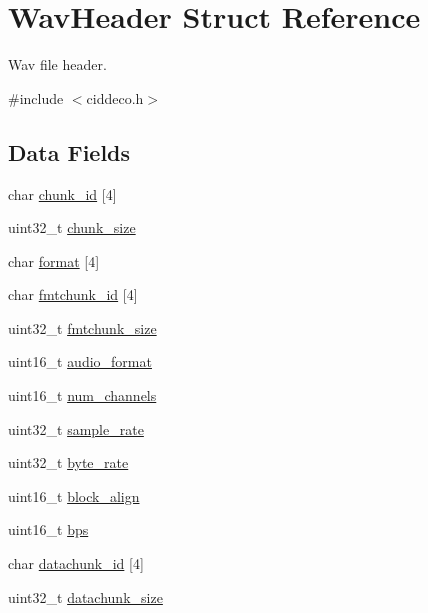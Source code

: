 \hypertarget{structWavHeader}{}\section{Wav\+Header Struct Reference}
\label{structWavHeader}


Wav file header.  




{\ttfamily \#include $<$ciddeco.\+h$>$}

\subsection*{Data Fields}
\begin{DoxyCompactItemize}
\item 
char \hyperlink{structWavHeader_abd1d58ce017d5f2b70956efb6cf0b8fc}{chunk\+\_\+id} \mbox{[}4\mbox{]}
\item 
uint32\+\_\+t \hyperlink{structWavHeader_a480084e5c629d831fcdbc1c8d8b0a891}{chunk\+\_\+size}
\item 
char \hyperlink{structWavHeader_ab1748144c5a74f514973d13aa2257e7c}{format} \mbox{[}4\mbox{]}
\item 
char \hyperlink{structWavHeader_a627f513d728348d196e9a01094a9a2a4}{fmtchunk\+\_\+id} \mbox{[}4\mbox{]}
\item 
uint32\+\_\+t \hyperlink{structWavHeader_a4ef84c118ca11eb3aca198b8e2a14294}{fmtchunk\+\_\+size}
\item 
uint16\+\_\+t \hyperlink{structWavHeader_a175a26284b9fe51691b0a4e600997dca}{audio\+\_\+format}
\item 
uint16\+\_\+t \hyperlink{structWavHeader_a072ed76b242729913c20ed54643c7516}{num\+\_\+channels}
\item 
uint32\+\_\+t \hyperlink{structWavHeader_ae6042020cde1102dfeabfc30576c1e52}{sample\+\_\+rate}
\item 
uint32\+\_\+t \hyperlink{structWavHeader_a9e6e51114d572f6fe71cd00cd101343d}{byte\+\_\+rate}
\item 
uint16\+\_\+t \hyperlink{structWavHeader_a55417acd8c1774caee8928ad8fe86c07}{block\+\_\+align}
\item 
uint16\+\_\+t \hyperlink{structWavHeader_a891be94aa1622e40a40b1887ec0d950f}{bps}
\item 
char \hyperlink{structWavHeader_a5baeb0eb6368ca4135a0bb0334e15bd5}{datachunk\+\_\+id} \mbox{[}4\mbox{]}
\item 
uint32\+\_\+t \hyperlink{structWavHeader_a9979ac5e8fa6b5595e2cfbe2d4fe0ff3}{datachunk\+\_\+size}
\end{DoxyCompactItemize}


